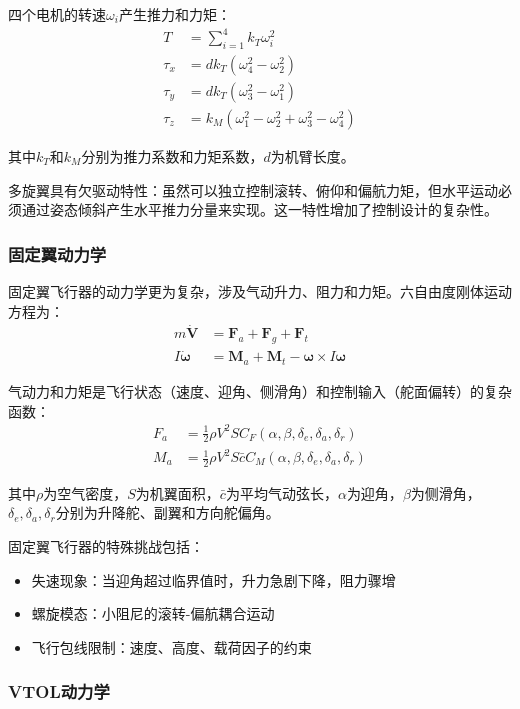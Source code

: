 \documentclass[12pt,a4paper]{ctexart}
\begin{document}
四个电机的转速$\omega_i$产生推力和力矩：
\begin{align}
    T &= \sum_{i=1}^4 k_T \omega_i^2 \\
    \tau_x &= dk_T(\omega_4^2 - \omega_2^2) \\
    \tau_y &= dk_T(\omega_3^2 - \omega_1^2) \\
    \tau_z &= k_M(\omega_1^2 - \omega_2^2 + \omega_3^2 - \omega_4^2)
\end{align}

其中$k_T$和$k_M$分别为推力系数和力矩系数，$d$为机臂长度。

多旋翼具有欠驱动特性：虽然可以独立控制滚转、俯仰和偏航力矩，但水平运动必须通过姿态倾斜产生水平推力分量来实现。这一特性增加了控制设计的复杂性。

\subsubsection{固定翼动力学}

固定翼飞行器的动力学更为复杂，涉及气动升力、阻力和力矩。六自由度刚体运动方程为：
\begin{align}
    m\dot{\mathbf{V}} &= \mathbf{F}_a + \mathbf{F}_g + \mathbf{F}_t \\
    I\dot{\boldsymbol{\omega}} &= \mathbf{M}_a + \mathbf{M}_t - \boldsymbol{\omega} \times I\boldsymbol{\omega}
\end{align}

气动力和力矩是飞行状态（速度、迎角、侧滑角）和控制输入（舵面偏转）的复杂函数：
\begin{align}
    F_a &= \frac{1}{2}\rho V^2 S C_F(\alpha, \beta, \delta_e, \delta_a, \delta_r) \\
    M_a &= \frac{1}{2}\rho V^2 S \bar{c} C_M(\alpha, \beta, \delta_e, \delta_a, \delta_r)
\end{align}

其中$\rho$为空气密度，$S$为机翼面积，$\bar{c}$为平均气动弦长，$\alpha$为迎角，$\beta$为侧滑角，$\delta_e, \delta_a, \delta_r$分别为升降舵、副翼和方向舵偏角。

固定翼飞行器的特殊挑战包括：
\begin{itemize}
    \item 失速现象：当迎角超过临界值时，升力急剧下降，阻力骤增
    \item 螺旋模态：小阻尼的滚转-偏航耦合运动
    \item 飞行包线限制：速度、高度、载荷因子的约束
\end{itemize}

\subsubsection{VTOL动力学}
\end{document}
